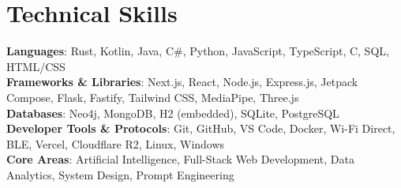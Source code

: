 \documentclass[a4paper,10pt]{article}
\begin{document}
\section{Technical Skills}
 \begin{itemize}[leftmargin=0.15in, label={}]
    \small{\item{
     \textbf{Languages}{: Rust, Kotlin, Java, C\#, Python, JavaScript, TypeScript, C, SQL, HTML/CSS} \\
     \textbf{Frameworks \& Libraries}{: Next.js, React, Node.js, Express.js, Jetpack Compose, Flask, Fastify, Tailwind CSS, MediaPipe, Three.js} \\
     \textbf{Databases}{: Neo4j, MongoDB, H2 (embedded), SQLite, PostgreSQL} \\
     \textbf{Developer Tools \& Protocols}{: Git, GitHub, VS Code, Docker, Wi-Fi Direct, BLE, Vercel, Cloudflare R2, Linux, Windows} \\
     \textbf{Core Areas}{: Artificial Intelligence, Full-Stack Web Development, Data Analytics, System Design, Prompt Engineering}
    }}
 \end{itemize}


\end{document}
